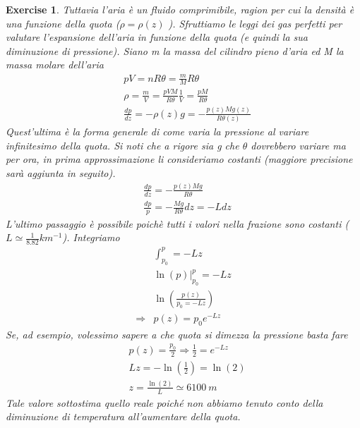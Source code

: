 \documentclass[10pt,a4paper]{article}
\newtheorem{exercise}{Exercise}
\begin{document}
\begin{exercise}
Tuttavia l'aria è un fluido comprimibile, ragion per cui la densità è una funzione della quota ($\rho = \rho(z)$ ). Sfruttiamo le leggi dei gas perfetti per valutare l'espansione dell'aria in funzione della quota (e quindi la sua diminuzione di pressione). Siano m la massa del cilindro pieno d'aria ed M la massa molare dell'aria
\begin{align*} 
	&p V = n R \theta = \frac{m}{M} R \theta \\
	&\rho = \frac{m}{V} = \frac{p V M}{R \theta} \frac{1}{V} = \frac{p M}{R \theta}\\
	&\frac{dp}{dz}=-\rho(z) g = - \frac{p(z) M g(z)}{R\theta(z)}
\end{align*} 
Quest'ultima è la forma generale di come varia la pressione al variare infinitesimo della quota. Si noti che a rigore sia g che $\theta$ dovrebbero variare ma per ora, in prima approssimazione li consideriamo costanti (maggiore precisione sarà aggiunta in seguito). 
\begin{align}\label{eq:esercizio_pressione}
	&\frac{dp}{dz}=- \frac{p(z) M g}{R\theta}\nonumber\\
	&\frac{dp}{p} = -\frac{M g}{R \theta} dz = - L dz
\end{align} 
L'ultimo passaggio è possibile poichè tutti i valori nella frazione sono costanti ($ L \simeq \frac{1}{8.82} km^{-1}$). Integriamo
\begin{align*} 
	&\int_{p_0}^{p} = -L z\\
	& \ln(p) \Big|_{p_0}^p = -L z\\
	&\ln\left(\frac{p(z)}{p_0= - L z}\right)\\
	\Rightarrow& p(z) = p_0 e^{-L z}
\end{align*} 
Se, ad esempio, volessimo sapere a che quota si dimezza la pressione basta fare
\begin{align*} 
	&p(z) = \frac{p_0}{2} \Rightarrow \frac{1}{2} = e^{-L z}\\
	&L z = -\ln(\frac{1}{2}) = \ln(2) \\
	&z = \frac{\ln(2)}{L} \simeq 6100\ m
\end{align*} 
Tale valore sottostima quello reale poiché non abbiamo tenuto conto della diminuzione di temperatura all'aumentare della quota.
\end{exercise}
\end{document}
